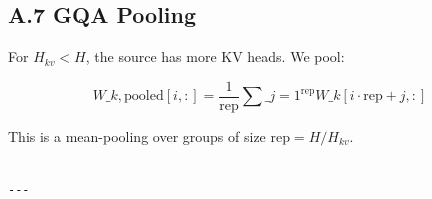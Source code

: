 \subsection{A.7 GQA Pooling}

For $H_{kv} < H$, the source has more KV heads. We pool:

\[
W\_{k,\text{pooled}}[i, :] = \frac{1}{\text{rep}} \sum\_{j=1}^{\text{rep}} W\_{k}[i \cdot \text{rep} + j, :]
\tag{A.7}
\]

This is a mean-pooling over groups of size $\text{rep} = H / H_{kv}$.
\begin{lstlisting}

---
\end{lstlisting}
